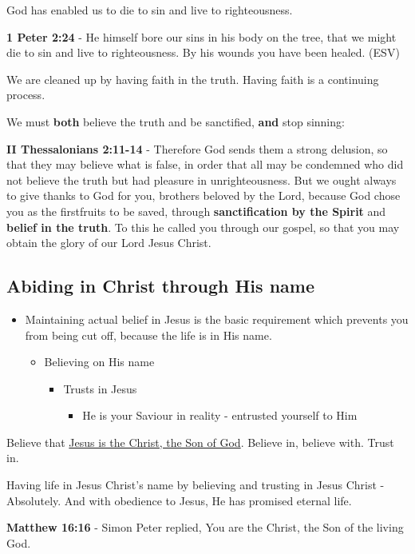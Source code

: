 \documentclass[11pt]{article}
\begin{document}
God has enabled us to die to sin and live to righteousness.

\textbf{1 Peter 2:24} -  He himself bore our sins in his body on the tree, that we might die to sin and live to righteousness.  By his wounds you have been healed.  (ESV)

We are cleaned up by having faith in the truth. Having faith is a continuing process.

We must \textbf{both} believe the truth and be sanctified, \textbf{and} stop sinning:

\textbf{II Thessalonians 2:11-14} - Therefore God sends them a strong delusion, so that they may believe what is false, in order that all may be condemned who did not believe the truth but had pleasure in unrighteousness. But we ought always to give thanks to God for you, brothers beloved by the Lord, because God chose you as the firstfruits to be saved, through \textbf{sanctification by the Spirit} and \textbf{belief in the truth}. To this he called you through our gospel, so that you may obtain the glory of our Lord Jesus Christ.

\subsection{Abiding in Christ through His name}
\label{sec:orgd85f0fa}
\begin{itemize}
\item Maintaining actual belief in Jesus is the basic requirement which prevents you from being cut off, because the life is in His name.
\begin{itemize}
\item Believing on His name
\begin{itemize}
\item Trusts in Jesus
\begin{itemize}
\item He is your Saviour in reality - entrusted yourself to Him
\end{itemize}
\end{itemize}
\end{itemize}
\end{itemize}

Believe that \uline{Jesus is the Christ, the Son of God}. Believe in, believe with. Trust in.

Having life in Jesus Christ's name by believing and trusting in Jesus Christ - Absolutely.
And with obedience to Jesus, He has promised eternal life.

\textbf{Matthew 16:16} - Simon Peter replied, You are the Christ, the Son of the living God.
\end{document}
